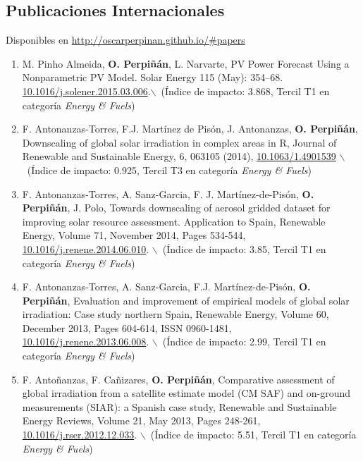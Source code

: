 \documentclass[article, a4paper]{memoir}
\begin{document}
\subsection{Publicaciones Internacionales}
\label{sec:orgheadline28}
Disponibles en \url{http://oscarperpinan.github.io/#papers}

\begin{enumerate}
\item M. Pinho Almeida, \textbf{O. Perpiñán}, L. Narvarte, PV Power Forecast Using a Nonparametric PV Model. Solar Energy 115 (May): 354–68. \href{http://dx.doi.org/10.1016/j.solener.2015.03.006}{10.1016/j.solener.2015.03.006}.$\backslash$\ (Índice de impacto: 3.868, Tercil T1 en categoría \emph{Energy \& Fuels})

\item F. Antonanzas-Torres, F.J. Martínez de Pisón, J. Antonanzas, \textbf{O. Perpiñán}, Downscaling of global solar irradiation in complex areas in R, Journal of Renewable and Sustainable Energy, 6, 063105 (2014), \href{http://dx.doi.org/10.1063/1.4901539}{10.1063/1.4901539} $\backslash$\ (Índice de impacto: 0.925, Tercil T3 en categoría \emph{Energy \& Fuels})

\item F. Antonanzas-Torres, A. Sanz-Garcia, F. J. Martínez-de-Pisón, \textbf{O. Perpiñán}, J. Polo, Towards downscaling of aerosol gridded dataset for improving solar resource assessment. Application to Spain, Renewable Energy, Volume 71, November 2014, Pages 534-544, \href{http://dx.doi.org/10.1016/j.renene.2014.06.010}{10.1016/j.renene.2014.06.010}. $\backslash$\ (Índice de impacto: 3.85, Tercil T1 en categoría \emph{Energy \& Fuels})

\item F. Antonanzas-Torres, A. Sanz-Garcia, F.J. Martínez-de-Pisón, \textbf{O. Perpiñán}, Evaluation and improvement of empirical models of global solar irradiation: Case study northern Spain, Renewable Energy, Volume 60, December 2013, Pages 604-614, ISSN 0960-1481, \href{http://dx.doi.org/10.1016/j.renene.2013.06.008}{10.1016/j.renene.2013.06.008}. $\backslash$\ (Índice de impacto: 2.99, Tercil T1 en categoría \emph{Energy \& Fuels})

\item F. Antoñanzas, F. Cañizares, \textbf{O. Perpiñán}, Comparative assessment of global irradiation from a satellite estimate model (CM SAF) and on-ground measurements (SIAR): a Spanish case study, Renewable and Sustainable Energy Reviews, Volume 21, May 2013, Pages 248-261, \href{http://dx.doi.org/10.1016/j.rser.2012.12.033}{10.1016/j.rser.2012.12.033}. $\backslash$\ (Índice de impacto: 5.51, Tercil T1 en categoría \emph{Energy \& Fuels})


\end{enumerate}
\end{document}
